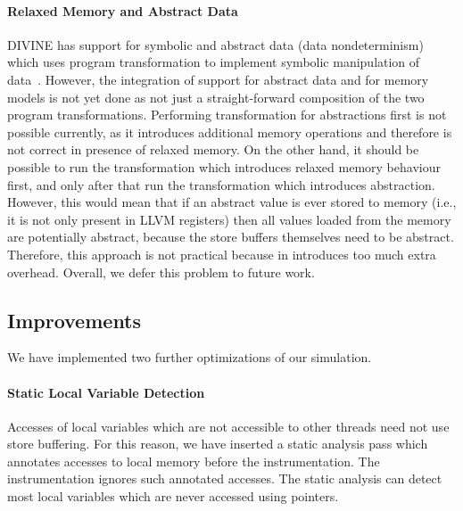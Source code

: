 \paragraph{Relaxed Memory and Abstract Data}
%
DIVINE has support for symbolic and abstract data (data nondeterminism) which
uses program transformation to implement symbolic manipulation of
data~.
However, the integration of support for abstract data and for memory models is
not yet done as not just a straight-forward composition of the two program
transformations.
Performing transformation for abstractions first is not possible currently, as
it introduces additional memory operations and therefore is not correct in
presence of relaxed memory.
On the other hand, it should be possible to run the transformation which
introduces relaxed memory behaviour first, and only after that run the
transformation which introduces abstraction.
However, this would mean that if an abstract value is ever stored to memory
(i.e., it is not only present in LLVM registers) then all values loaded from
the memory are potentially abstract, because the store buffers themselves need
to be abstract.
Therefore, this approach is not practical because in introduces too much extra
overhead.
Overall, we defer this problem to future work.

\subsection{Improvements} \label{sec:mm:opt}

We have implemented two further optimizations of our \xtso simulation.

\paragraph{Static Local Variable Detection}
Accesses of local variables which are not accessible to other threads need not
use store buffering.  For this reason, we have inserted a static analysis pass
which annotates accesses to local memory before the \xtso instrumentation.  The
instrumentation ignores such annotated accesses.  The static analysis can
detect most local variables which are never accessed using pointers.



